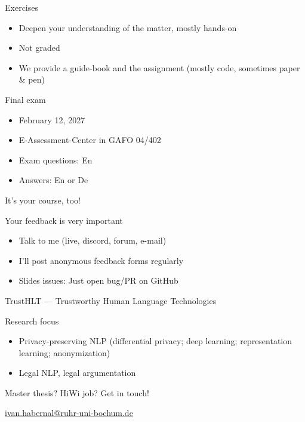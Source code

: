 \documentclass[12pt,aspectratio=169,handout]{beamer}
\begin{document}
\begin{frame}{Exercises}
	
\begin{itemize}
	\item Deepen your understanding of the matter, mostly hands-on
	\item Not graded
	\item We provide a guide-book and the assignment (mostly code, sometimes paper \& pen)
\end{itemize}


\end{frame}

\begin{frame}{Final exam}
	
	
\begin{itemize}
\item February 12, 2027
\item E-Assessment-Center in GAFO 04/402
\item Exam questions: En
\item Answers: En or De
\end{itemize}

\end{frame}



\begin{frame}{It's your course, too!}
	
Your feedback is very important

\begin{itemize}
	\item Talk to me (live, discord, forum, e-mail)
	\item I'll post anonymous feedback forms regularly
	\item Slides issues: Just open bug/PR on GitHub
\end{itemize}


\end{frame}



\begin{frame}{TrustHLT --- Trustworthy Human Language Technologies}
	


\begin{block}{Research focus}
\begin{itemize}
	
	\item Privacy-preserving NLP (differential privacy; deep learning; representation learning; anonymization)	
	\item Legal NLP, legal argumentation
	
\end{itemize}	
\end{block}


	\bigskip
	
	Master thesis? HiWi job? Get in touch!
	
	\url{ivan.habernal@ruhr-uni-bochum.de}
	
\end{frame}
\end{document}
